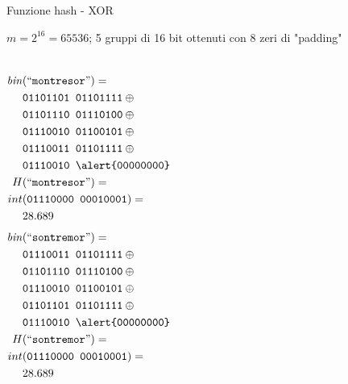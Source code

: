 \begin{frame}[shrink=5]{Funzione hash - XOR}

\vspace{-9pt}
\begin{myboxtitle}[Esempio]
$m = 2^{16} = 65536$; 5 gruppi di 16 bit ottenuti con 8 zeri di "\alert{padding}"

\begin{columns}[T]
\begin{align*}
\mathit{bin}&(``\texttt{montresor}") = \\ 
&\texttt{01101101 01101111}  \oplus {} \\
&\texttt{01101110 01110100} \oplus {} \\
&\texttt{01110010 01100101} \oplus {} \\
&\texttt{01110011 01101111} \oplus {} \\
&\texttt{01110010 \alert{00000000}} \\
H&(``\texttt{montresor}") = {}\\
int&(\texttt{01110000 00010001}) = {}\\
& 28.689 
\end{align*}
\begin{align*}
\mathit{bin}&(``\texttt{sontremor}") = {} \\
&\texttt{01110011 01101111}  \oplus {} \\
&\texttt{01101110 01110100} \oplus {} \\
&\texttt{01110010 01100101} \oplus {} \\
&\texttt{01101101 01101111} \oplus {} \\
&\texttt{01110010 \alert{00000000}} \\
H&(``\texttt{sontremor}") = {}\\
int&(\texttt{01110000 00010001}) = {}\\
& 28.689 
\end{align*}
\end{columns}

\end{myboxtitle}

\end{frame}


